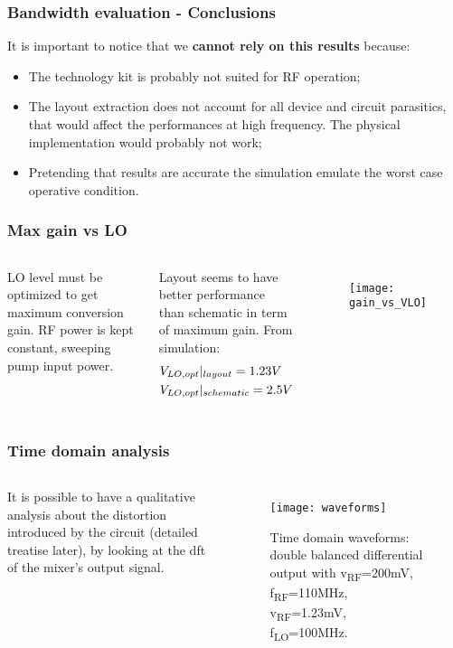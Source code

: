 \begin{frame}
	\frametitle{Bandwidth evaluation - Conclusions}
	It is important to notice that we \textbf{cannot rely on this results} because:
	\begin{itemize}
		\item The technology kit is probably not suited for RF operation;
		\item The layout extraction does not account for all device and circuit parasitics, that would affect the performances at high frequency. The physical implementation would  probably not work;
		\item Pretending that results are accurate the simulation emulate the worst case operative condition. 
	\end{itemize}
\end{frame}

\begin{frame}
\frametitle{Max gain vs LO}
\begin{columns}
	LO level must be optimized to get maximum conversion gain. RF power is kept constant, sweeping pump input power.
	
	Layout seems to have better performance than schematic in term of maximum gain. From simulation:
	\begin{align}
	&V_{LO,opt}|_{layout}=1.23V \notag \\
	&V_{LO,opt}|_{schematic}=2.5V \notag
	\end{align}
	\begin{figure}[H]
		\centering
		\texttt{[image: gain\_vs\_VLO]}
		\label{fig:maxGainvsLO}
	\end{figure}
\end{columns}
\end{frame}

\begin{frame}
\frametitle{Time domain analysis}
\begin{columns}
	It is possible to have a qualitative analysis about the distortion introduced by the circuit (detailed treatise later), by looking at the dft of the mixer's output signal. 
	\begin{figure}[H]
		\centering
		\texttt{[image: waveforms]}
		\caption{Time domain waveforms: double balanced differential output with v\textsubscript{RF}=200mV,  f\textsubscript{RF}=110MHz, v\textsubscript{RF}=1.23mV, f\textsubscript{LO}=100MHz.}
		\label{fig:TdomaniWF}
	\end{figure}
\end{columns}
\end{frame}

